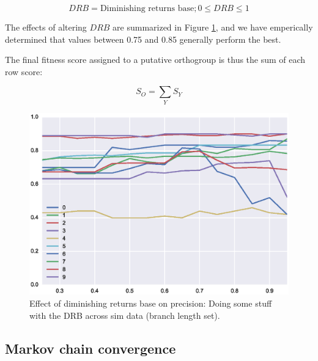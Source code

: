 \documentclass[twocolumn]{bmcart}%
\begin{document}
$$
DRB = \text{Diminishing returns base}; 0 \leq DRB \leq 1
$$

The effects of altering $DRB$ are summarized in Figure \ref{fig:dim_rets}, and we have emperically determined that values between 0.75 and 0.85 generally perform the best.

The final fitness score assigned to a putative orthogroup is thus the sum of each row score:

$$
S_O = \sum_{Y} S_Y
$$

\begin{figure}[t]
  \begin{center}
  \includegraphics[height=0.22\textheight]{../figures/dim_ret_precision_line.eps}
\end{center}
\caption{Effect of diminishing returns base on precision: Doing some stuff with the DRB across sim data (branch length set).}
\label{fig:dim_rets}
\end{figure}


\subsection{Markov chain convergence}
\lipsum[3]


\end{document}
